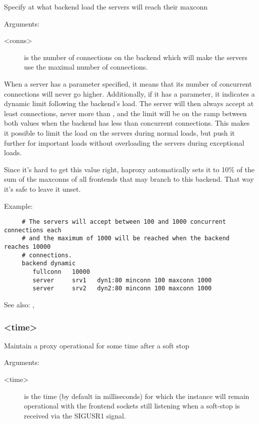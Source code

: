   Specify at what backend load the servers will reach their maxconn
  
  
  Arguments:
  \begin{description}
  \item[<conns>]
              is the number of connections on the backend which will make the
              servers use the maximal number of connections.
  \end{description}

  When a server has a  parameter specified, it means that its number
  of concurrent connections will never go higher. Additionally, if it has a
   parameter, it indicates a dynamic limit following the backend's
  load. The server will then always accept at least  connections,
  never more than , and the limit will be on the ramp between both
  values when the backend has less than  concurrent connections. This
  makes it possible to limit the load on the servers during normal loads, but
  push it further for important loads without overloading the servers during
  exceptional loads.

  Since it's hard to get this value right, haproxy automatically sets it to
  10\% of the sum of the maxconns of all frontends that may branch to this
  backend. That way it's safe to leave it unset.

  Example:
  \begin{verbatim}
     # The servers will accept between 100 and 1000 concurrent connections each
     # and the maximum of 1000 will be reached when the backend reaches 10000
     # connections.
     backend dynamic
        fullconn   10000
        server     srv1   dyn1:80 minconn 100 maxconn 1000
        server     srv2   dyn2:80 minconn 100 maxconn 1000
  \end{verbatim}

  See also: , 

\subsubsection[grace]{ <time>}

  Maintain a proxy operational for some time after a soft stop
  
  
  Arguments:
  \begin{description}
  \item[<time>]
              is the time (by default in milliseconds) for which the instance
              will remain operational with the frontend sockets still listening
              when a soft-stop is received via the SIGUSR1 signal.
  \end{description}

